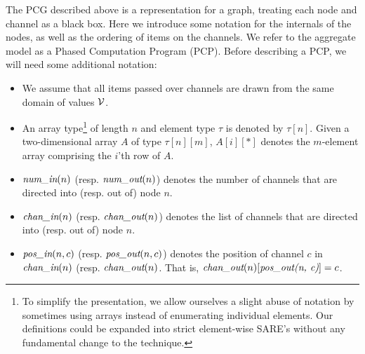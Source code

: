 The PCG described above is a representation for a graph, treating each
node and channel as a black box.  Here we introduce some notation for
the internals of the nodes, as well as the ordering of items on the
channels.  We refer to the aggregate model as a Phased Computation
Program (PCP).  Before describing a PCP, we will need some additional
notation:
\begin{itemize}

\item We assume that all items passed over channels are drawn from the
same domain of values ${\cal V}$.

\item An array type\footnote{To simplify the presentation, we allow
ourselves a slight abuse of notation by sometimes using arrays instead
of enumerating individual elements.  Our definitions could be expanded
into strict element-wise SARE's without any fundamental change to the
technique.} of length $n$ and element type $\tau$ is denoted by
$\tau[n]$.  Given a two-dimensional array $A$ of type $\tau[n][m]$,
$A[i][*]$ denotes the $m$-element array comprising the $i$'th row of
$A$.

\item $\mbox{\it num\_in}(n)$ (resp. $\mbox{\it num\_out}(n)$) denotes the number of
channels that are directed into (resp. out of) node $n$.

\item $\mbox{\it chan\_in}(n)$ (resp. $\mbox{\it chan\_out}(n)$) denotes the list of
channels that are directed into (resp. out of) node $n$.

\item $\mbox{\it pos\_in}(n, c)$ (resp. $\mbox{\it pos\_out}(n, c)$) denotes the
position of channel $c$ in $\mbox{\it chan\_in}(n)$
(resp. $\mbox{\it chan\_out}(n)$.  That is, $\mbox{\it chan\_out}(n)[\mbox{\it pos\_out(n,
c)}] = c$.

\end{itemize}


